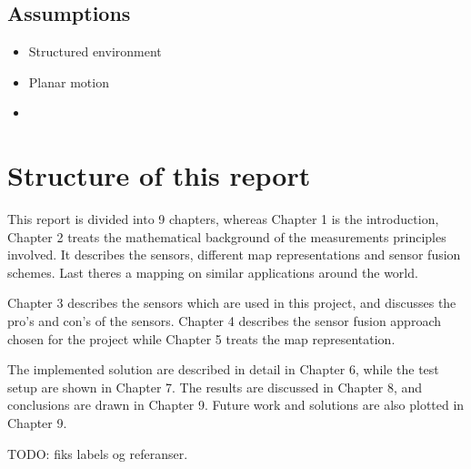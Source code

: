 \subsection{Assumptions}
\begin{itemize}
    \item Structured environment
    \item Planar motion
    \item 
\end{itemize}



\section{Structure of this report}
This report is divided into 9 chapters, whereas Chapter 1 is the introduction, Chapter 2
treats the mathematical background of the measurements principles involved. It describes
the sensors, different map representations and sensor fusion schemes. Last theres a
mapping on similar applications around the world.

Chapter 3 describes the sensors which are used in this project, and discusses the pro's
and con's of the sensors. Chapter 4 describes the sensor fusion approach chosen for the
project while Chapter 5 treats the map representation. 

The implemented solution are described in detail in Chapter 6, while the test setup are
shown in Chapter 7. The results are discussed in Chapter 8, and conclusions are drawn in
Chapter 9. Future work and solutions are also plotted in Chapter 9.

TODO: fiks labels og referanser. 

